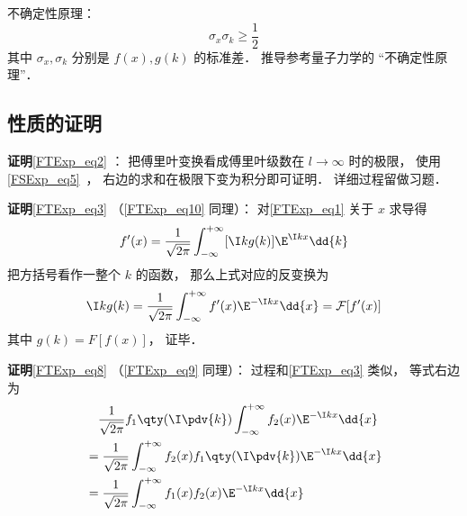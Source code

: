 不确定性原理：
\begin{equation}
\sigma_x \sigma_k \geqslant \frac{1}{2}
\end{equation}
其中 $\sigma_x, \sigma_k$ 分别是 $f(x), g(k)$ 的标准差． 推导参考量子力学的 “不确定性原理”．

\subsection{性质的证明}

\textbf{证明}\autoref{FTExp_eq2} ： 把傅里叶变换看成傅里叶级数在 $l \to \infty$ 时的极限， 使用\autoref{FSExp_eq5}~， 右边的求和在极限下变为积分即可证明． 详细过程留做习题．

\textbf{证明}\autoref{FTExp_eq3} （\autoref{FTExp_eq10} 同理）： 对\autoref{FTExp_eq1} 关于 $x$ 求导得
\begin{equation}
f'(x) = \frac{1}{\sqrt{2\pi }} \int_{-\infty }^{+\infty } [\I kg(k)]\E^{\I kx} \dd{k}
\end{equation}
把方括号看作一整个 $k$ 的函数， 那么上式对应的反变换为
\begin{equation}
\I kg(k) = \frac{1}{\sqrt{2\pi }} \int_{-\infty }^{+\infty } f'(x) \E^{-\I kx} \dd{x} = \mathcal F [f'(x)]
\end{equation}
其中 $g(k) = F [f(x)]$， 证毕．

\textbf{证明}\autoref{FTExp_eq8} （\autoref{FTExp_eq9} 同理）： 过程和\autoref{FTExp_eq3} 类似， 等式右边为
\begin{equation}
\begin{aligned}
& \quad \frac{1}{\sqrt{2\pi }} f_1\qty(\I \pdv{k}) \int_{-\infty }^{+\infty } f_2(x)\E^{-\I kx} \dd{x}\\
&= \frac{1}{\sqrt{2\pi }} \int_{-\infty }^{+\infty } f_2(x) f_1\qty(\I \pdv{k})\E^{-\I kx} \dd{x}\\
&= \frac{1}{\sqrt{2\pi }} \int_{-\infty }^{+\infty } f_1(x) f_2(x) \E^{-\I kx} \dd{x}
\end{aligned}
\end{equation}
